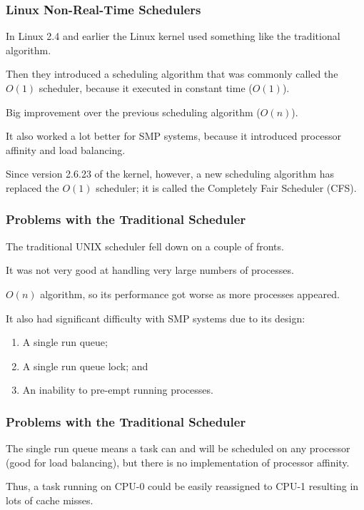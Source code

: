 \begin{frame}
\frametitle{Linux Non-Real-Time Schedulers}

In Linux 2.4 and earlier the Linux kernel used something like the traditional algorithm. 

Then they introduced a scheduling algorithm that was commonly called the $O(1)$ scheduler, because it executed in constant time ($O(1)$). 

Big improvement over the previous scheduling algorithm ($O(n)$).

It also worked a lot better for SMP systems, because it introduced processor affinity and load balancing. 

Since version 2.6.23 of the kernel, however, a new scheduling algorithm has replaced the $O(1)$ scheduler; it is called the \alert{Completely Fair Scheduler} (CFS).


\end{frame}

\begin{frame}
\frametitle{Problems with the Traditional Scheduler}

The traditional UNIX scheduler fell down on a couple of fronts. 

It was not very good at handling very large numbers of processes.

$O(n)$ algorithm, so its performance got worse as more processes appeared. 

It also had significant difficulty with SMP systems due to its design:

\begin{enumerate}
	\item A single run queue;
	\item A single run queue lock; and
	\item An inability to pre-empt running processes.
\end{enumerate}

\end{frame}

\begin{frame}
\frametitle{Problems with the Traditional Scheduler}

The single run queue means a task can and will be scheduled on any processor (good for load balancing), but there is no implementation of processor affinity. 

Thus, a task running on CPU-0 could be easily reassigned to CPU-1 resulting in lots of cache misses.

\end{frame}

